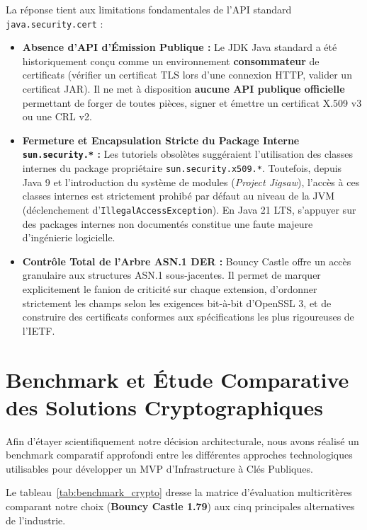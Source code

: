\documentclass[12pt,a4paper]{report}
\begin{document}
La réponse tient aux limitations fondamentales de l'API standard \texttt{java.security.cert} :
\begin{itemize}
    \item \textbf{Absence d'API d'Émission Publique :} Le JDK Java standard a été historiquement conçu comme un environnement \textbf{consommateur} de certificats (vérifier un certificat TLS lors d'une connexion HTTP, valider un certificat JAR). Il ne met à disposition \textbf{aucune API publique officielle} permettant de forger de toutes pièces, signer et émettre un certificat X.509 v3 ou une CRL v2.
    \item \textbf{Fermeture et Encapsulation Stricte du Package Interne \texttt{sun.security.*} :} Les tutoriels obsolètes suggéraient l'utilisation des classes internes du package propriétaire \texttt{sun.security.x509.*}. Toutefois, depuis Java 9 et l'introduction du système de modules (\textit{Project Jigsaw}), l'accès à ces classes internes est strictement prohibé par défaut au niveau de la JVM (déclenchement d'\texttt{IllegalAccessException}). En Java 21 LTS, s'appuyer sur des packages internes non documentés constitue une faute majeure d'ingénierie logicielle.
    \item \textbf{Contrôle Total de l'Arbre ASN.1 DER :} Bouncy Castle offre un accès granulaire aux structures ASN.1 sous-jacentes. Il permet de marquer explicitement le fanion de criticité sur chaque extension, d'ordonner strictement les champs selon les exigences bit-à-bit d'OpenSSL 3, et de construire des certificats conformes aux spécifications les plus rigoureuses de l'IETF.
\end{itemize}

\section{Benchmark et Étude Comparative des Solutions Cryptographiques}

Afin d'étayer scientifiquement notre décision architecturale, nous avons réalisé un benchmark comparatif approfondi entre les différentes approches technologiques utilisables pour développer un MVP d'Infrastructure à Clés Publiques.

Le tableau~\ref{tab:benchmark_crypto} dresse la matrice d'évaluation multicritères comparant notre choix (\textbf{Bouncy Castle 1.79}) aux cinq principales alternatives de l'industrie.
\end{document}
